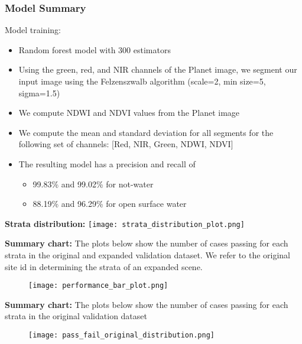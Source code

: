 \documentclass[8pt]{beamer}
\begin{document}
\begin{frame}
  \frametitle{Model Summary}
  \vfill
  Model training:
  \begin{itemize}
    \item Random forest model with 300 estimators
    \item Using the green, red, and NIR channels of the Planet image, we segment our input image using the Felzenszwalb algorithm (scale=2, min size=5, sigma=1.5) \\
    \item We compute NDWI and NDVI values from the Planet image
    \item We compute the mean and standard deviation for all segments for the following set of channels: [Red, NIR, Green, NDWI, NDVI]
    \item The resulting model has a precision and recall of \\
    \begin{itemize}
    \item 99.83\% and 99.02\% for not-water 
    \item 88.19\% and 96.29\% for open surface water 
    \end{itemize}

  \end{itemize}
  \vfill
  \end{frame}
\begin{frame}
\textbf{Strata distribution:}
\vfill
\centering
\texttt{[image: strata\_distribution\_plot.png]}
\end{frame}

\begin{frame}
\textbf{Summary chart:}
The plots below show the number of cases passing for each strata in the original and expanded validation dataset. We refer to the original site id in determining the strata of an expanded scene.
\vfill
\begin{figure}
  \hspace*{-1cm}   
\texttt{[image: performance\_bar\_plot.png]}
\end{figure}
\end{frame}

\begin{frame}
  \textbf{Summary chart:}
  The plots below show the number of cases passing for each strata in the original validation dataset
  \begin{figure}
    \hspace*{-1cm}   
  \texttt{[image: pass\_fail\_original\_distribution.png]}
  \end{figure}
\end{frame}
\end{document}

